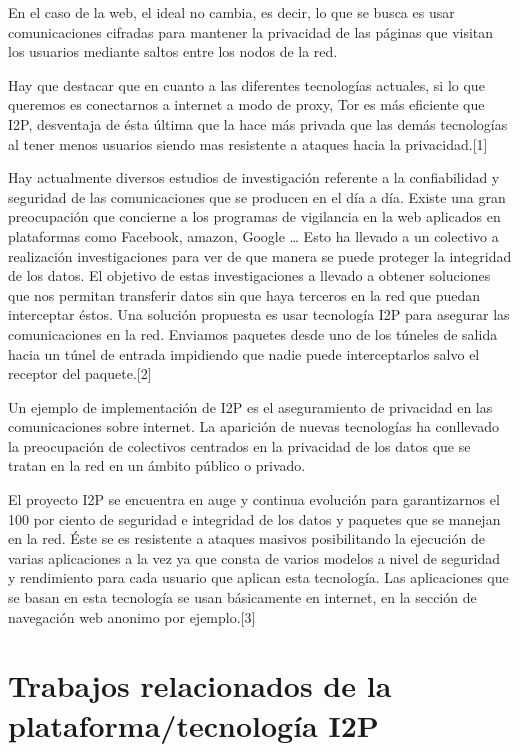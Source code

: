 \documentclass{article}
\begin{document}
En el caso de la web, el ideal no cambia, es decir, lo que se busca es usar comunicaciones cifradas para mantener la privacidad de las páginas que visitan los usuarios mediante saltos entre los nodos de la red.

Hay que destacar que en cuanto a las diferentes tecnologías actuales, si lo que queremos es conectarnos a internet a modo de proxy,  Tor es más eficiente que I2P, desventaja de ésta última que la hace más privada que las demás tecnologías al tener menos usuarios siendo mas resistente a ataques hacia la privacidad.[1]

Hay actualmente diversos estudios de investigación referente a la confiabilidad y seguridad de las comunicaciones que se producen en el día a día.
Existe una gran preocupación que concierne a los programas de vigilancia en la web aplicados en plataformas como Facebook, amazon, Google … Esto ha llevado a un colectivo a realización investigaciones para ver de que manera se puede proteger la integridad de los datos. El objetivo de estas investigaciones a llevado a obtener soluciones que nos permitan transferir datos sin que haya terceros
en la red que puedan interceptar éstos.
Una solución propuesta es usar tecnología I2P para asegurar las comunicaciones en la red. Enviamos paquetes desde uno de los túneles de salida hacia un túnel de entrada  impidiendo que nadie puede interceptarlos salvo el receptor del paquete.[2]

Un ejemplo de implementación de I2P es el aseguramiento de privacidad en las comunicaciones sobre internet.
La aparición de nuevas tecnologías ha conllevado la preocupación de colectivos centrados en la privacidad de los datos que se tratan en la red en un ámbito público o privado.

El proyecto I2P se encuentra en auge y continua evolución para garantizarnos el 100 por ciento de seguridad e integridad de los datos y paquetes que se manejan en la red. Éste se  es resistente a ataques masivos posibilitando la ejecución de varias aplicaciones a 
la vez ya que consta de varios modelos a nivel de seguridad y rendimiento para cada usuario que aplican esta tecnología. Las aplicaciones que se basan en esta tecnología se usan básicamente en internet, en la sección de navegación web anonimo por ejemplo.[3]

\pagebreak

\section{Trabajos relacionados de la plataforma/tecnología I2P}
\end{document}
